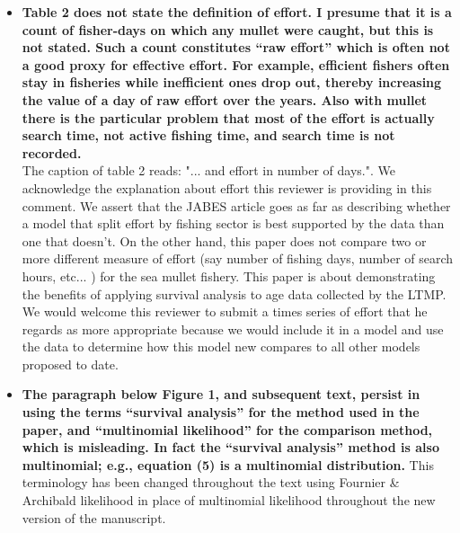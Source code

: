 \documentclass[11pt]{article}
\begin{document}
\begin{spacing}{1.2}
\begin{itemize}
\item {\bf Table 2 does not state the definition of effort.  I presume that it is a count of fisher-days on which any mullet were caught, but this is not stated.  Such a count constitutes “raw effort” which is often not a good proxy for effective effort.  For example, efficient fishers often stay in fisheries while inefficient ones drop out, thereby increasing the value of a day of raw effort over the years.  Also with mullet there is the particular problem that most of the effort is actually search time, not active fishing time, and search time is not recorded.}\\
The caption of table 2 reads: "... and effort in number of days.". We acknowledge the explanation about effort this reviewer is providing in this comment. We assert that the JABES article goes as far as describing whether a model that split effort by fishing sector is best supported by the data than one that doesn't. On the other hand, this paper does not compare two or more different measure of effort (say number of fishing days, number of search hours, etc... ) for the sea mullet fishery. This paper is about demonstrating the benefits of applying survival analysis to age data collected by the LTMP. We would welcome this reviewer to submit a times series of effort that he regards as more appropriate because we would include it in a model and use the data to determine how this model new compares to all other models proposed to date.\\

\item {\bf The paragraph below Figure 1, and subsequent text, persist in using the terms “survival analysis” for the method used in the paper, and “multinomial likelihood” for the comparison method, which is misleading.  In fact the “survival analysis” method is also multinomial; e.g., equation (5) is a multinomial distribution.}
This terminology has been changed throughout the text using Fournier \& Archibald likelihood in place of multinomial likelihood throughout the new version of the manuscript.\\

\end{itemize}
 

\end{spacing}
\end{document}
